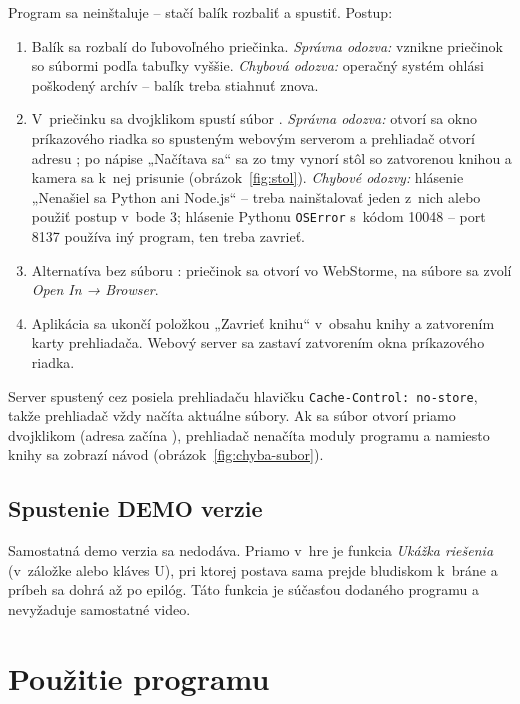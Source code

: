 \documentclass[11pt, a4paper]{article}
\begin{document}
Program sa neinštaluje – stačí balík rozbaliť a spustiť. Postup:
\begin{enumerate}
  \item Balík  sa rozbalí do ľubovoľného priečinka.
    \emph{Správna odozva:} vznikne priečinok  so súbormi podľa tabuľky vyššie.
    \emph{Chybová odozva:} operačný systém ohlási poškodený archív – balík treba stiahnuť znova.
  \item V~priečinku sa dvojklikom spustí súbor .
    \emph{Správna odozva:} otvorí sa okno príkazového riadka so spusteným webovým serverom
    a prehliadač otvorí adresu ; po nápise „Načítava sa“ sa zo
    tmy vynorí stôl so zatvorenou knihou a kamera sa k~nej prisunie (obrázok~\ref{fig:stol}).
    \emph{Chybové odozvy:} hlásenie „Nenašiel sa Python ani Node.js“ – treba nainštalovať
    jeden z~nich alebo použiť postup v~bode 3; hlásenie Pythonu \texttt{OSError} s~kódom
    10048 – port 8137 používa iný program, ten treba zavrieť.
  \item Alternatíva bez súboru : priečinok sa otvorí vo WebStorme, na súbore
     sa zvolí \emph{Open In → Browser}.
  \item Aplikácia sa ukončí položkou „Zavrieť knihu“ v~obsahu knihy a zatvorením karty
    prehliadača. Webový server sa zastaví zatvorením okna príkazového riadka.
\end{enumerate}

Server spustený cez  posiela prehliadaču hlavičku
\texttt{Cache-Control: no-store}, takže prehliadač vždy načíta aktuálne súbory. Ak sa súbor
 otvorí priamo dvojklikom (adresa začína ), prehliadač
nenačíta moduly programu a namiesto knihy sa zobrazí návod (obrázok~\ref{fig:chyba-subor}).

\subsection{Spustenie DEMO verzie}

Samostatná demo verzia sa nedodáva. Priamo v~hre je funkcia \emph{Ukážka riešenia}
(v~záložke alebo kláves U), pri ktorej postava sama prejde bludiskom k~bráne a príbeh sa
dohrá až po epilóg. Táto funkcia je súčasťou dodaného programu a nevyžaduje samostatné video.

\section{Použitie programu}
\end{document}
